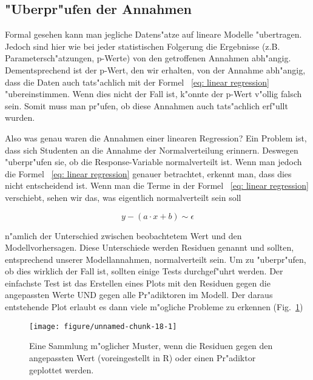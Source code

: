 \documentclass[a4paper,twoside]{tufte-book}\usepackage[]{graphicx}\usepackage[]{color}
\makeatletter
\def\maxwidth{ %
  \ifdim\Gin@nat@width>\linewidth
    \linewidth
  \else
    \Gin@nat@width
  \fi
}
\makeatother
\begin{document}
\subsection{"Uberpr"ufen der Annahmen}

Formal gesehen kann man jegliche Datens"atze auf lineare Modelle "ubertragen. Jedoch sind hier wie bei jeder statistischen Folgerung die Ergebnisse (z.B. Parametersch"atzungen, p-Werte) von den getroffenen Annahmen abh"angig. Dementsprechend ist der p-Wert, den wir erhalten, von der Annahme abh"angig, dass die Daten auch tats"achlich mit der Formel ~\ref{eq: linear regression} "ubereinstimmen. Wenn dies nicht der Fall ist, k"onnte der p-Wert v"ollig falsch sein. Somit muss man pr"ufen, ob diese Annahmen auch tats"achlich erf"ullt wurden.

Also was genau waren die Annahmen einer linearen Regression? Ein Problem ist, dass sich Studenten an die Annahme der Normalverteilung erinnern. Deswegen "uberpr"ufen sie, ob die Response-Variable normalverteilt ist. Wenn man jedoch die Formel ~\ref{eq: linear regression} genauer betrachtet, erkennt man, dass dies nicht entscheidend ist. Wenn man die Terme in der Formel ~\ref{eq: linear regression} verschiebt,
sehen wir das, was eigentlich normalverteilt sein soll

\begin{equation} \label{eq: linear regression}
y - (a \cdot x + b ) \sim \epsilon 
\end{equation}

n"amlich der Unterschied zwischen beobachtetem Wert und den Modellvorhersagen. Diese Unterschiede werden Residuen genannt und sollten, entsprechend unserer Modellannahmen, normalverteilt sein. Um zu "uberpr"ufen, ob dies wirklich der Fall ist, sollten einige Tests durchgef"uhrt werden. Der einfachste Test ist das Erstellen eines Plots mit den Residuen gegen die angepassten Werte UND gegen alle Pr"adiktoren im Modell. Der daraus entstehende Plot erlaubt es dann viele m"ogliche Probleme zu erkennen (Fig.~\ref{fig: ResidualPatterns})

\begin{figure}[htbp]
\begin{center}
\begin{Schunk}

\texttt{[image: figure/unnamed-chunk-18-1]} \end{Schunk}
\caption{Eine Sammlung m"oglicher Muster, wenn die Residuen gegen den angepassten Wert (voreingestellt in R) oder einen Pr"adiktor geplottet werden.}
\label{fig: ResidualPatterns}
\end{center}
\end{figure}
\end{document}
